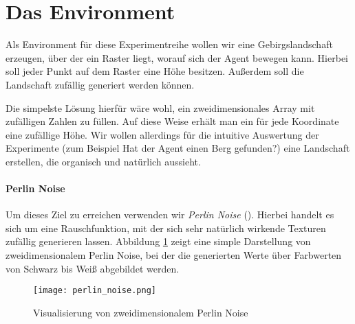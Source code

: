 \section{Das Environment}

Als Environment für diese Experimentreihe wollen wir eine Gebirgslandschaft erzeugen, über der ein Raster liegt, worauf sich der Agent bewegen kann. Hierbei soll jeder Punkt auf dem Raster eine Höhe besitzen. Außerdem soll die Landschaft zufällig generiert werden können.

Die simpelste Lösung hierfür wäre wohl, ein zweidimensionales Array mit zufälligen Zahlen zu füllen. Auf diese Weise erhält man ein für jede Koordinate eine zufällige Höhe. Wir wollen allerdings für die intuitive Auswertung der Experimente (zum Beispiel \glqq Hat der Agent einen Berg gefunden?\grqq) eine Landschaft erstellen, die organisch und natürlich aussieht.

\paragraph{Perlin Noise}
Um dieses Ziel zu erreichen verwenden wir \textit{Perlin Noise} (\cite{parberry2015modeling}). Hierbei handelt es sich um eine Rauschfunktion, mit der sich sehr natürlich wirkende Texturen zufällig generieren lassen. Abbildung \ref{img:perlinNoise} zeigt eine simple Darstellung von zweidimensionalem Perlin Noise, bei der die generierten Werte über Farbwerten von Schwarz bis Weiß abgebildet werden.

\begin{figure}[H]
    \centering
    \texttt{[image: perlin\_noise.png]}
    \caption{Visualisierung von zweidimensionalem Perlin Noise} \label{img:perlinNoise}
\end{figure}



